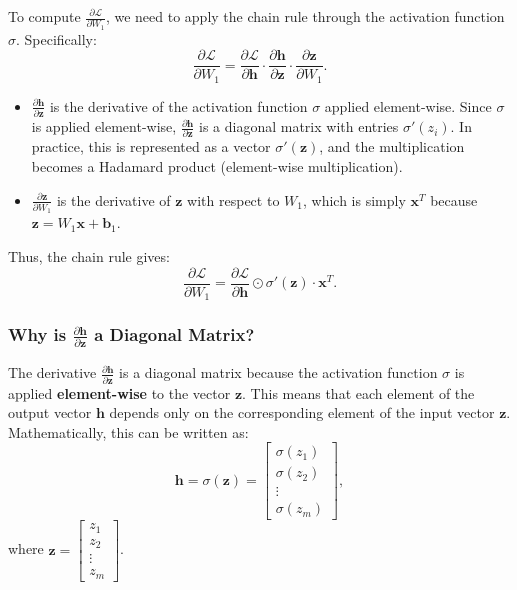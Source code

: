 \begin{notechapter}
To compute \( \frac{\partial \mathcal{L}}{\partial W_1} \), we need to apply the chain rule through the activation function \( \sigma \). Specifically:
\[
\frac{\partial \mathcal{L}}{\partial W_1} = \frac{\partial \mathcal{L}}{\partial \mathbf{h}} \cdot \frac{\partial \mathbf{h}}{\partial \mathbf{z}} \cdot \frac{\partial \mathbf{z}}{\partial W_1}.
\]

\begin{itemize}
    \item \( \frac{\partial \mathbf{h}}{\partial \mathbf{z}} \) is the derivative of the activation function \( \sigma \) applied element-wise. Since \( \sigma \) is applied element-wise, \( \frac{\partial \mathbf{h}}{\partial \mathbf{z}} \) is a diagonal matrix with entries \( \sigma'(z_i) \). In practice, this is represented as a vector \( \sigma'(\mathbf{z}) \), and the multiplication becomes a Hadamard product (element-wise multiplication).

    \item \( \frac{\partial \mathbf{z}}{\partial W_1} \) is the derivative of \( \mathbf{z} \) with respect to \( W_1 \), which is simply \( \mathbf{x}^T \) because \( \mathbf{z} = W_1 \mathbf{x} + \mathbf{b}_1 \).
\end{itemize}

Thus, the chain rule gives:
\[
\frac{\partial \mathcal{L}}{\partial W_1} = \frac{\partial \mathcal{L}}{\partial \mathbf{h}} \odot \sigma'(\mathbf{z}) \cdot \mathbf{x}^T.
\]

\subsubsection{Why is \( \frac{\partial \mathbf{h}}{\partial \mathbf{z}} \) a Diagonal Matrix?}
The derivative \( \frac{\partial \mathbf{h}}{\partial \mathbf{z}} \) is a diagonal matrix because the activation function \( \sigma \) is applied \textbf{element-wise} to the vector \( \mathbf{z} \). This means that each element of the output vector \( \mathbf{h} \) depends only on the corresponding element of the input vector \( \mathbf{z} \). Mathematically, this can be written as:
\[
\mathbf{h} = \sigma(\mathbf{z}) = \begin{bmatrix} \sigma(z_1) \\ \sigma(z_2) \\ \vdots \\ \sigma(z_m) \end{bmatrix},
\]
where \( \mathbf{z} = \begin{bmatrix} z_1 \\ z_2 \\ \vdots \\ z_m \end{bmatrix} \).


\end{notechapter}
